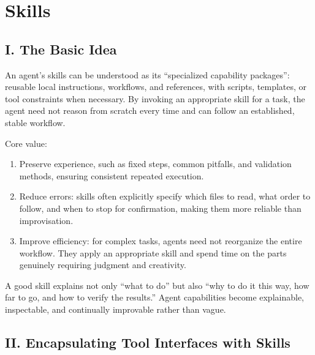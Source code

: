 \setcounter{section}{2}

\hypertarget{skills}{%
\section{Skills}\label{skills}}

\hypertarget{i.-the-basic-idea-1}{%
\subsection{I. The Basic Idea}\label{i.-the-basic-idea-1}}

An agent's skills can be understood as its ``specialized capability packages'': reusable local instructions, workflows, and references, with scripts, templates, or tool constraints when necessary. By invoking an appropriate skill for a task, the agent need not reason from scratch every time and can follow an established, stable workflow.

Core value:

\begin{enumerate}
\def\labelenumi{\arabic{enumi}.}
\item
  Preserve experience, such as fixed steps, common pitfalls, and validation methods, ensuring consistent repeated execution.
\item
  Reduce errors: skills often explicitly specify which files to read, what order to follow, and when to stop for confirmation, making them more reliable than improvisation.
\item
  Improve efficiency: for complex tasks, agents need not reorganize the entire workflow. They apply an appropriate skill and spend time on the parts genuinely requiring judgment and creativity.
\end{enumerate}

A good skill explains not only ``what to do'' but also ``why to do it this way, how far to go, and how to verify the results.'' Agent capabilities become explainable, inspectable, and continually improvable rather than vague.

\hypertarget{ii.-encapsulating-tool-interfaces-with-skills}{%
\subsection{II. Encapsulating Tool Interfaces with Skills}\label{ii.-encapsulating-tool-interfaces-with-skills}}

